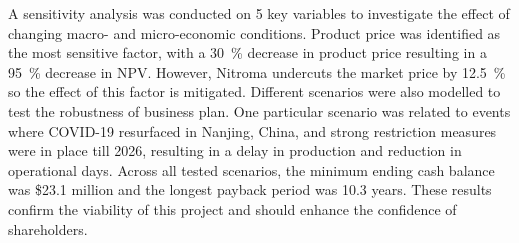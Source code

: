 A sensitivity analysis was conducted on 5 key variables to investigate the effect of changing macro- and micro-economic conditions. Product price was identified as the most sensitive factor, with a \SI{30}{\percent} decrease in product price resulting in a \SI{95}{\percent} decrease in NPV. However, Nitroma undercuts the market price by \SI{12.5}{\percent} so the effect of this factor is mitigated. Different scenarios were also modelled to test the robustness of business plan. One particular scenario was related to events where COVID-19 resurfaced in Nanjing, China, and strong restriction measures were in place till 2026, resulting in a delay in production and reduction in operational days. Across all tested scenarios, the minimum ending cash balance was \$23.1 million and the longest payback period was 10.3 years. These results confirm the viability of this project and should enhance the confidence of shareholders.